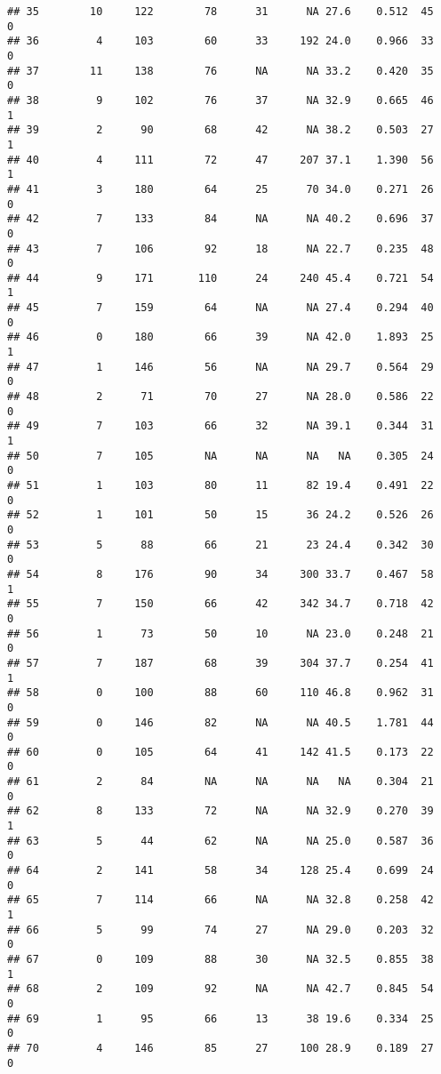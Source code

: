 \documentclass[
]{article}
\begin{document}
\begin{verbatim}
## 35        10     122        78      31      NA 27.6    0.512  45    0
## 36         4     103        60      33     192 24.0    0.966  33    0
## 37        11     138        76      NA      NA 33.2    0.420  35    0
## 38         9     102        76      37      NA 32.9    0.665  46    1
## 39         2      90        68      42      NA 38.2    0.503  27    1
## 40         4     111        72      47     207 37.1    1.390  56    1
## 41         3     180        64      25      70 34.0    0.271  26    0
## 42         7     133        84      NA      NA 40.2    0.696  37    0
## 43         7     106        92      18      NA 22.7    0.235  48    0
## 44         9     171       110      24     240 45.4    0.721  54    1
## 45         7     159        64      NA      NA 27.4    0.294  40    0
## 46         0     180        66      39      NA 42.0    1.893  25    1
## 47         1     146        56      NA      NA 29.7    0.564  29    0
## 48         2      71        70      27      NA 28.0    0.586  22    0
## 49         7     103        66      32      NA 39.1    0.344  31    1
## 50         7     105        NA      NA      NA   NA    0.305  24    0
## 51         1     103        80      11      82 19.4    0.491  22    0
## 52         1     101        50      15      36 24.2    0.526  26    0
## 53         5      88        66      21      23 24.4    0.342  30    0
## 54         8     176        90      34     300 33.7    0.467  58    1
## 55         7     150        66      42     342 34.7    0.718  42    0
## 56         1      73        50      10      NA 23.0    0.248  21    0
## 57         7     187        68      39     304 37.7    0.254  41    1
## 58         0     100        88      60     110 46.8    0.962  31    0
## 59         0     146        82      NA      NA 40.5    1.781  44    0
## 60         0     105        64      41     142 41.5    0.173  22    0
## 61         2      84        NA      NA      NA   NA    0.304  21    0
## 62         8     133        72      NA      NA 32.9    0.270  39    1
## 63         5      44        62      NA      NA 25.0    0.587  36    0
## 64         2     141        58      34     128 25.4    0.699  24    0
## 65         7     114        66      NA      NA 32.8    0.258  42    1
## 66         5      99        74      27      NA 29.0    0.203  32    0
## 67         0     109        88      30      NA 32.5    0.855  38    1
## 68         2     109        92      NA      NA 42.7    0.845  54    0
## 69         1      95        66      13      38 19.6    0.334  25    0
## 70         4     146        85      27     100 28.9    0.189  27    0

\end{verbatim}
\end{document}
